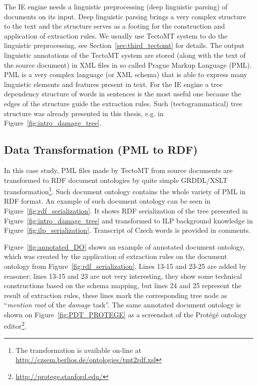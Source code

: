 The IE engine needs a linguistic preprocessing (deep linguistic parsing) of documents on its input. Deep linguistic parsing brings a very complex structure to the text and the structure serves as a footing for the construction and application of extraction rules. We usually use TectoMT system to do the linguistic preprocessing, see Section~\ref{sec:third_tectomt} for details. The output linguistic annotations of the TectoMT system are stored (along with the text of the source document) in XML files in so called Prague Markup Language (PML). PML is a very complex language (or XML schema) that is able to express many linguistic elements and features present in text. For the IE engine a tree dependency structure of words in sentences is the most useful one because the edges of the structure guide the extraction rules. Such (tectogrammatical) tree structure was already presented in this thesis, e.g. in Figure~\ref{fig:intro_damage_tree}.


\subsection{Data Transformation (PML to RDF)} \label{sec:onto_pml_to_rdf}

In this case study, PML files made by TectoMT from source documents are transformed to RDF document ontologies by quite simple GRDDL/XSLT transformation\footnote{The transformation is available on-line at \url{http://czsem.berlios.de/ontologies/tmt2rdf.xsl}}. Such document ontology contains the whole variety of PML in RDF format. An example of such document ontology can be seen in Figure~\ref{fig:rdf_serialization}. It shows RDF serialization of the tree presented in Figure~\ref{fig:intro_damage_tree} and transformed to ILP background knowledge in Figure~\ref{fig:ilp_serialization}. Transcript of Czech words is provided in comments.

Figure~\ref{fig:annotated_DO} shows an example of annotated document ontology, which was created by the application of extraction rules on the document ontology from Figure~\ref{fig:rdf_serialization}. Lines 13-15 and 23-25 are added by reasoner; lines 13-15 and 23 are not very interesting, they show some technical constructions based on the schema mapping, but lines 24 and 25 represent the result of extraction rules, these lines mark the corresponding tree node as ``\emph{mention root} of the \emph{damage} task''. The same annotated document ontology is shown on Figure~\ref{fig:PDT_PROTEGE} as a screenshot of the Protégé ontology editor\footnote{\url{http://protege.stanford.edu/}}.



